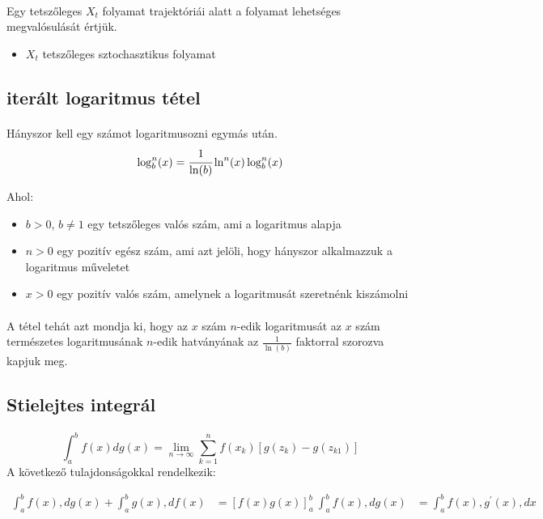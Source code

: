 \documentclass[11pt,a4pape,draftr]{article}
\begin{document}
				\paragraph{}
					Egy tetszőleges $X_t$ folyamat trajektóriái alatt a folyamat lehetséges megvalósulását értjük.
					\begin{itemize}
						\item $X_t$ tetszőleges sztochasztikus folyamat
					\end{itemize}
			\subsection{iterált logaritmus tétel}
				\paragraph{}
					Hányszor kell egy számot logaritmusozni egymás után.			
					$$\log_b^n(x) = \cfrac{1}{\ln(b)} \ln^{n}(x) \log_b^n(x)$$
					
					Ahol:
					\begin{itemize}
						\item   $b > 0$, $b \neq 1$ egy tetszőleges valós szám, ami a logaritmus alapja
						\item   $n > 0$ egy pozitív egész szám, ami azt jelöli, hogy hányszor alkalmazzuk a logaritmus műveletet
						\item   $x > 0$ egy pozitív valós szám, amelynek a logaritmusát szeretnénk kiszámolni
					\end{itemize}
				\paragraph{}
					A tétel tehát azt mondja ki, hogy az $x$ szám $n$-edik logaritmusát az $x$ szám természetes logaritmusának $n$-edik hatványának az $\frac{1}{\ln(b)}$ faktorral szorozva kapjuk meg.
			\subsection{Stielejtes integrál}
				\paragraph{}
					$$\int_a^b f(x) dg(x) = \lim_{n \to \infty} \sum_{k=1}^n f(x_k)[g(z_k) - g(z_{k1})]$$
					A következő tulajdonságokkal rendelkezik:

					\begin{align*}
						\int_a^b f(x) , dg(x) + \int_a^b g(x) , df(x) &= [f(x) g(x)]_a^b \
						\int_a^b f(x) , dg(x) &= \int_a^b f(x) , g^\prime (x) , dx
					\end{align*}
\end{document}
